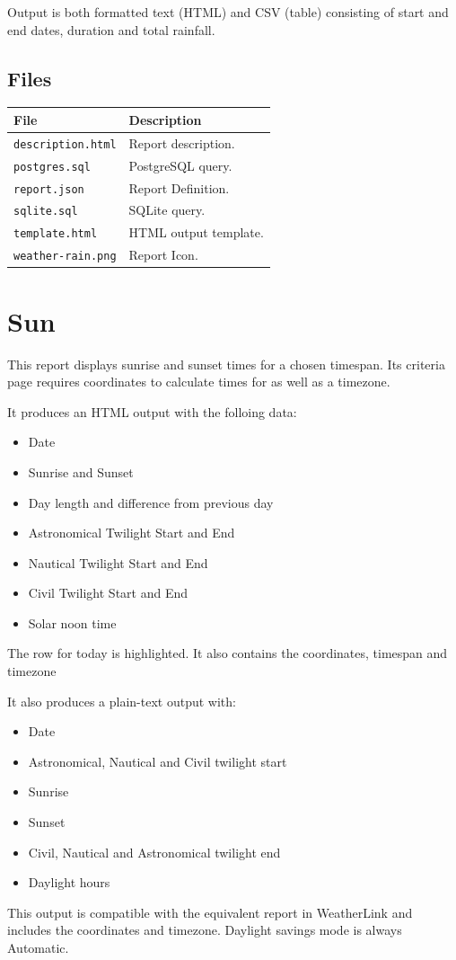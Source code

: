 \documentclass[a4paper,10pt]{book}
\begin{document}
Output is both formatted text (HTML) and CSV (table) consisting of start and end dates, duration and total rainfall.

\subsection{Files}
\begin{tabular}{p{4.5cm} l}
\hline
\textbf{File} & \textbf{Description} \\
\hline
\verb|description.html| & Report description. \\
\verb|postgres.sql| & PostgreSQL query.\\
\verb|report.json| & Report Definition.\\
\verb|sqlite.sql| & SQLite query.\\
\verb|template.html| & HTML output template.\\
\verb|weather-rain.png| & Report Icon.\\
\hline
\end{tabular}

\section{Sun}
This report displays sunrise and sunset times for a chosen timespan.  Its criteria page requires coordinates to calculate times for as well as a timezone.

It produces an HTML output with the folloing data:
\begin{itemize}
\item Date
\item Sunrise and Sunset
\item Day length and difference from previous day
\item Astronomical Twilight Start and End
\item Nautical Twilight Start and End
\item Civil Twilight Start and End
\item Solar noon time
\end{itemize}
The row for today is highlighted. It also contains the coordinates, timespan and timezone

It also produces a plain-text output with:
\begin{itemize}
\item Date
\item Astronomical, Nautical and Civil twilight start
\item Sunrise
\item Sunset
\item Civil, Nautical and Astronomical twilight end
\item Daylight hours
\end{itemize}
This output is compatible with the equivalent report in WeatherLink and includes the coordinates and timezone. Daylight savings mode is always Automatic.
\end{document}
